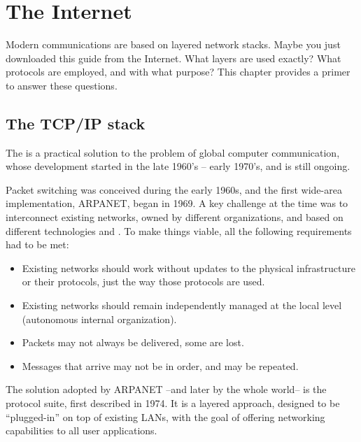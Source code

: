 
\chapter{The Internet}\label{sec:internet}

Modern communications are based on layered network stacks. 
Maybe you just downloaded this guide from the Internet.
% 
What layers are used exactly? What protocols are employed, and with what purpose?
% 
This chapter provides a primer to answer these questions.\\[-1cm]

\section{The TCP/IP stack}\label{sec:internet:the_tcp_ip_stack}


The  is a practical solution to the problem of global computer communication,
whose development started in the late 1960's -- early 1970's, and is still ongoing.

Packet switching was conceived during the early 1960s, and the first 
wide-area implementation, ARPANET, began in 1969. 
% 
A key challenge at the time was to interconnect existing networks, 
owned by different organizations, and based on different technologies and .
% 
To make things viable, all the following requirements had to be met:
\begin{itemize}
    \item Existing networks should work without updates to the physical infrastructure 
      or their protocols, just the way those protocols are used.
    \item Existing networks should remain independently managed at the local level (autonomous internal organization).
    \item Packets may not always be delivered, some are lost.
    \item Messages that arrive may not be in order, and may be repeated.
\end{itemize}

The solution adopted by ARPANET --and later by the whole world-- 
is the  protocol suite, first described in 1974. 
It is a layered approach, designed to be ``plugged-in'' on top of 
existing LANs, with the goal of offering networking 
capabilities to all user applications.

